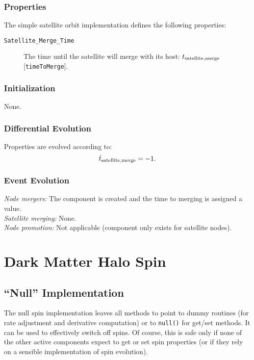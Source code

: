 \subsubsection{Properties}

The simple satellite orbit implementation defines the following properties:
\begin{description}
 \item [{\tt Satellite\_Merge\_Time}] The time until the satellite will merge with its host: $t_{\rm satellite, merge}$ [{\tt timeToMerge}].
\end{description}

\subsubsection{Initialization}

None.

\subsubsection{Differential Evolution}

Properties are evolved according to:
\begin{equation}
 \dot{t}_{\rm satellite, merge} = -1.
\end{equation}

\subsubsection{Event Evolution}

\noindent\emph{Node mergers:} The component is created and the time to merging is assigned a value.\\

\noindent\emph{Satellite merging:} None.\\

\noindent\emph{Node promotion:} Not applicable (component only exists for satellite nodes).\\

\section{Dark Matter Halo Spin}

\subsection{``Null'' Implementation}

The null spin implementation leaves all methods to point to dummy routines (for rate adjustment and derivative computation) or to {\tt null()} for get/set methods. It can be used to effectively switch off spins. Of course, this is safe only if none of the other active components expect to get or set spin properties (or if they rely on a sensible implementation of spin evolution).

